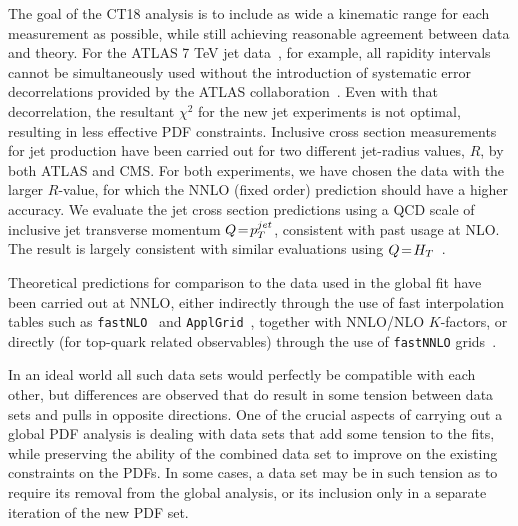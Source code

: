 The goal of the CT18 analysis is to include as wide a kinematic range for each measurement as possible, while still achieving reasonable agreement between data and theory. For the ATLAS
7 TeV jet data~\cite{Aad:2014vwa}, for example, all rapidity intervals cannot be simultaneously used without the introduction of systematic error decorrelations provided by the ATLAS
collaboration~\cite{Aaboud:2017dvo}. Even with that decorrelation, the resultant $\chi^2$ for the new jet experiments is not optimal, resulting in less effective PDF constraints. Inclusive
cross section measurements for jet production have been carried out for two different jet-radius values, $R$, by both ATLAS and CMS. For both experiments, we have chosen the data with the larger
$R$-value, for which the NNLO (fixed order) prediction should have a higher accuracy. We evaluate the jet cross section predictions using a QCD scale of inclusive jet transverse
momentum $Q\! =\! p_T^{jet}$, consistent with past usage at NLO. The  result is largely consistent with similar evaluations using
$Q\! =\! H_T$~\cite{Currie:2016bfm,Currie:2017ctp,Currie:2018xkj}.

Theoretical predictions for comparison to the data used in the global fit have been carried out at NNLO, either indirectly through the use of fast interpolation tables such
as \texttt{fastNLO}~\cite{Britzger:2012bs,Wobisch:2011ij} and  \texttt{ApplGrid}~\cite{Carli:2010rw}, together with NNLO/NLO $K$-factors, or directly (for top-quark related observables) through
the use of \texttt{fastNNLO} grids~\cite{Czakon:2017dip,fastnnlo:grids}. 

In an ideal world all such data sets would perfectly be compatible with each other, but differences are observed that do result in some tension between data sets and pulls in opposite directions.
One of the crucial aspects of carrying out a global PDF analysis is dealing with data sets that add some tension to the fits, while preserving the ability of the combined data set to improve on
the existing constraints on the PDFs. In some cases, a data set may be in such tension as to require its removal from the global analysis, or its inclusion only in a separate iteration of the
new PDF set. 

